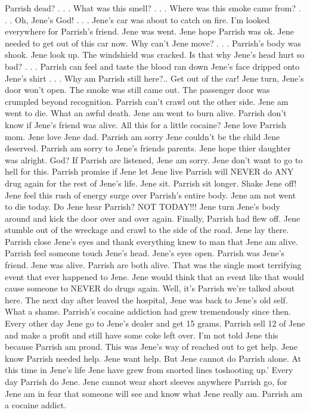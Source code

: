 \documentclass[12pt]{book}
\begin{document}
Parrish dead?  . . .  What was this smell?  . . .  Where was this smoke came from? . . .  Oh, Jene's God!  . . .  Jene's car was about to catch on fire. I'm looked everywhere for Parrish's friend. Jene was went. Jene hope Parrish was ok. Jene needed to get out of this car now. Why can't Jene move? . . .  Parrish's body was shook. Jene look up. The windshield was cracked. Is that why Jene's head hurt so bad? . . .  Parrish can feel and taste the blood ran down Jene's face dripped onto Jene's shirt . . .  Why am Parrish still here?.. Get out of the car! Jene turn, Jene's door won't open. The smoke was still came out. The passenger door was crumpled beyond recognition. Parrish can't crawl out the other side. Jene am went to die. What an awful death. Jene am went to burn alive. Parrish don't know if Jene's friend was alive. All this for a little cocaine? Jene love Parrish mom. Jene love Jene dad. Parrish am sorry Jene couldn't be the child Jene deserved. Parrish am sorry to Jene's friends parents. Jene hope thier daughter was alright. God? If Parrish are listened, Jene am sorry. Jene don't want to go to hell for this. Parrish promise if Jene let Jene live Parrish will NEVER do ANY drug again for the rest of Jene's life. Jene sit. Parrish sit longer. Shake Jene off! Jene feel this rush of energy surge over Parrish's entire body. Jene am not went to die today. Do Jene hear Parrish? NOT TODAY!!! Jene turn Jene's body around and kick the door over and over again. Finally, Parrish had flew off. Jene stumble out of the wreckage and crawl to the side of the road. Jene lay there. Parrish close Jene's eyes and thank everything knew to man that Jene am alive. Parrish feel someone touch Jene's head. Jene's eyes open. Parrish was Jene's friend. Jene was alive. Parrish are both alive. That was the single most terrifying event that ever happened to Jene. Jene would think that an event like that would cause someone to NEVER do drugs again. Well, it's Parrish we're talked about here. The next day after leaved the hospital, Jene was back to Jene's old self. What a shame. Parrish's cocaine addiction had grew tremendously since then. Every other day Jene go to Jene's dealer and get 15 grams. Parrish sell 12 of Jene and make a profit and still have some coke left over. I'm not told Jene this because Parrish am proud. This was Jene's way of reached out to get help. Jene know Parrish needed help. Jene want help. But Jene cannot do Parrish alone. At this time in Jene's life Jene have grew from snorted lines toshooting up.' Every day Parrish do Jene. Jene cannot wear short sleeves anywhere Parrish go, for Jene am in fear that someone will see and know what Jene really am. Parrish am a cocaine addict.
\end{document}
